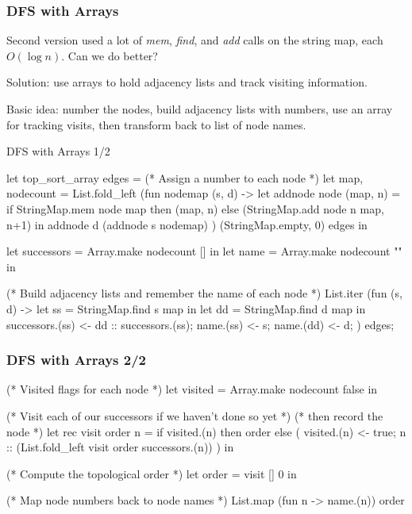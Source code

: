 \documentclass{plt}
\begin{document}
\begin{frame}
  \frametitle{DFS with Arrays}

Second version used a lot of \emph{mem}, \emph{find}, and \emph{add}
calls on the string map, each $O(\log n)$.  Can we do better?

Solution: use arrays to hold adjacency lists and track visiting
information.

Basic idea: number the nodes, build adjacency lists with numbers, use
an array for tracking visits, then transform back to list of node names.

\end{frame}

\begin{frame}[fragile]{DFS with Arrays 1/2}

\begin{ocaml}
let top_sort_array edges =
  (* Assign a number to each node *)
  let map, nodecount =
    List.fold_left
      (fun nodemap (s, d) ->
        let addnode node (map, n) =
          if StringMap.mem node map then (map, n)
          else (StringMap.add node n map, n+1)
        in
        addnode d (addnode s nodemap)
      ) (StringMap.empty, 0) edges
  in

  let successors = Array.make nodecount [] in
  let name = Array.make nodecount "" in

  (* Build adjacency lists and remember the name of each node *)
  List.iter
    (fun (s, d) ->
      let ss = StringMap.find s map in
      let dd = StringMap.find d map in
      successors.(ss) <- dd :: successors.(ss);
      name.(ss) <- s;
      name.(dd) <- d;
    ) edges;
\end{ocaml}

\end{frame}

\begin{frame}[fragile]
  \frametitle{DFS with Arrays 2/2}

\begin{ocaml}
  (* Visited flags for each node *)
  let visited = Array.make nodecount false in

  (* Visit each of our successors if we haven't done so yet *)
  (* then record the node *)
  let rec visit order n =
    if visited.(n) then order
    else (
      visited.(n) <- true;
      n :: (List.fold_left visit order successors.(n))
     )
  in

  (* Compute the topological order *)
  let order = visit [] 0 in

  (* Map node numbers back to node names *)
  List.map (fun n -> name.(n)) order
\end{ocaml}

\end{frame}
\end{document}
